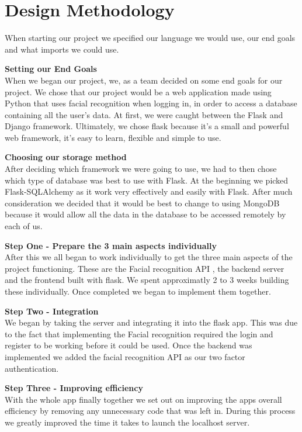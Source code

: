 \documentclass{article}
\begin{document}
\newpage

\section{Design Methodology}
When starting our project we specified our language we would use, our end goals  and what imports we could use.\medskip

\textbf{Setting our End Goals} \\
When we began our project, we, as a team decided on some end goals for our project.  We chose that our project would be a web application made using Python that uses facial recognition when logging in, in order to access a database containing all the user’s data.
At first, we were caught between the Flask and Django framework. Ultimately, we chose flask because it’s a small and powerful web framework, it’s easy to learn, flexible and simple to use.\medskip

\textbf{Choosing our storage method} \\
After deciding which framework we were going to use, we had to then chose which type of database was best to use with Flask. At the beginning we picked Flask-SQLAlchemy as it work very effectively and easily with Flask. After much consideration we decided that it would be best to change to using MongoDB because it would allow all the data in the database to be accessed remotely by each of us.\medskip

\textbf{Step One - Prepare the 3 main aspects individually} \\
After this we all began to work individually to get the three main aspects of the project functioning. These are the Facial recognition API , the backend server and the frontend built with flask. We spent approximatly 2 to 3 weeks building these individually. Once completed we began to implement them together.\medskip

\textbf{Step Two - Integration} \\
We began by taking the server and integrating it into the flask app. This was due to the fact that implementing the Facial recognition required the login and register to be working before it could be used.
Once the backend was implemented we added the facial recognition API as our two factor authentication.\medskip

\textbf{Step Three - Improving efficiency} \\
With the whole app finally together we set out on improving the apps overall efficiency by  removing any unnecessary code that was left in. During this process we greatly improved the time it takes to launch the localhost server.\medskip
\end{document}
